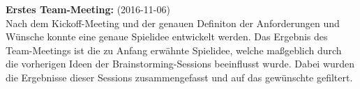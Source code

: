 \textbf{Erstes Team-Meeting:} (2016-11-06)\\
Nach dem Kickoff-Meeting und der genauen Definiton der Anforderungen und Wünsche konnte eine genaue Spielidee entwickelt werden.
Das Ergebnis des Team-Meetings ist die zu Anfang erwähnte Spielidee, welche maßgeblich durch die vorherigen Ideen der Brainstorming-Sessions beeinflusst wurde. Dabei wurden die Ergebnisse dieser Sessions zusammengefasst und auf das gewünschte gefiltert.
\newline